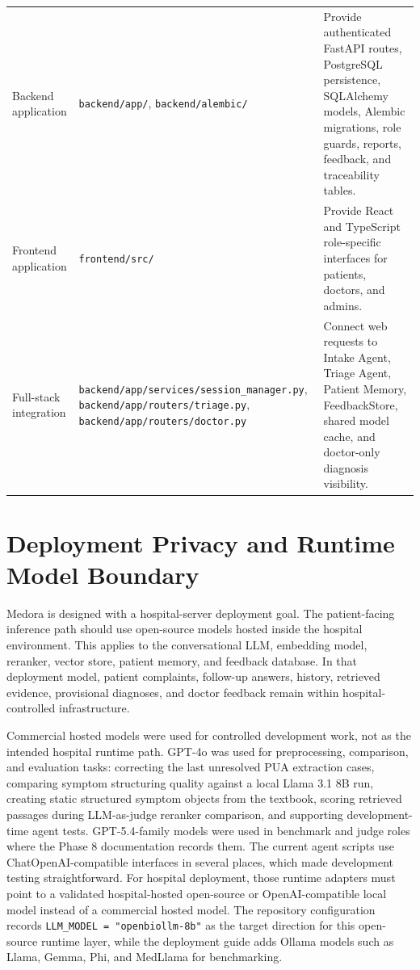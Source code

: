 \begin{longtable}{p{} p{} p{}}
Backend application & \texttt{backend/app/}, \texttt{backend/alembic/} & Provide authenticated FastAPI routes, PostgreSQL persistence, SQLAlchemy models, Alembic migrations, role guards, reports, feedback, and traceability tables.\\
Frontend application & \texttt{frontend/src/} & Provide React and TypeScript role-specific interfaces for patients, doctors, and admins.\\
Full-stack integration & \texttt{backend/app/services/session\_manager.py}, \texttt{backend/app/routers/triage.py}, \texttt{backend/app/routers/doctor.py} & Connect web requests to Intake Agent, Triage Agent, Patient Memory, FeedbackStore, shared model cache, and doctor-only diagnosis visibility.\\
\bottomrule
\end{longtable}

\section{Deployment Privacy and Runtime Model Boundary}

Medora is designed with a hospital-server deployment goal. The patient-facing inference path should use open-source models hosted inside the hospital environment. This applies to the conversational LLM, embedding model, reranker, vector store, patient memory, and feedback database. In that deployment model, patient complaints, follow-up answers, history, retrieved evidence, provisional diagnoses, and doctor feedback remain within hospital-controlled infrastructure.

Commercial hosted models were used for controlled development work, not as the intended hospital runtime path. GPT-4o was used for preprocessing, comparison, and evaluation tasks: correcting the last unresolved PUA extraction cases, comparing symptom structuring quality against a local Llama 3.1 8B run, creating static structured symptom objects from the textbook, scoring retrieved passages during LLM-as-judge reranker comparison, and supporting development-time agent tests. GPT-5.4-family models were used in benchmark and judge roles where the Phase 8 documentation records them. The current agent scripts use ChatOpenAI-compatible interfaces in several places, which made development testing straightforward. For hospital deployment, those runtime adapters must point to a validated hospital-hosted open-source or OpenAI-compatible local model instead of a commercial hosted model. The repository configuration records \texttt{LLM\_MODEL = "openbiollm-8b"} as the target direction for this open-source runtime layer, while the deployment guide adds Ollama models such as Llama, Gemma, Phi, and MedLlama for benchmarking.


